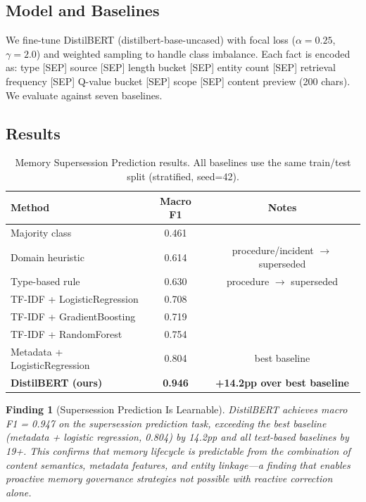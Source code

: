 \documentclass{article}
\newtheorem{finding}{Finding}
\begin{document}
\subsection{Model and Baselines}

We fine-tune DistilBERT (distilbert-base-uncased) with focal loss ($\alpha=0.25$, $\gamma=2.0$) and weighted sampling to handle class imbalance. Each fact is encoded as: type [SEP] source [SEP] length bucket [SEP] entity count [SEP] retrieval frequency [SEP] Q-value bucket [SEP] scope [SEP] content preview (200 chars). We evaluate against seven baselines.

\subsection{Results}

\begin{table}[h]
\centering
\caption{Memory Supersession Prediction results. All baselines use the same train/test split (stratified, seed=42).}
\label{tab:supersession}
\begin{tabular}{lcc}
\toprule
Method & Macro F1 & Notes \\
\midrule
Majority class & 0.461 & \\
Domain heuristic & 0.614 & procedure/incident $\to$ superseded \\
Type-based rule & 0.630 & procedure $\to$ superseded \\
TF-IDF + LogisticRegression & 0.708 & \\
TF-IDF + GradientBoosting & 0.719 & \\
TF-IDF + RandomForest & 0.754 & \\
Metadata + LogisticRegression & 0.804 & best baseline \\
\midrule
\textbf{DistilBERT (ours)} & \textbf{0.946} & \textbf{+14.2pp over best baseline} \\
\bottomrule
\end{tabular}
\end{table}

\begin{finding}[Supersession Prediction Is Learnable]
DistilBERT achieves macro F1 = 0.947 on the supersession prediction task, exceeding the best baseline (metadata + logistic regression, 0.804) by 14.2pp and all text-based baselines by 19+. This confirms that memory lifecycle is predictable from the combination of content semantics, metadata features, and entity linkage---a finding that enables proactive memory governance strategies not possible with reactive correction alone.
\end{finding}
\end{document}
